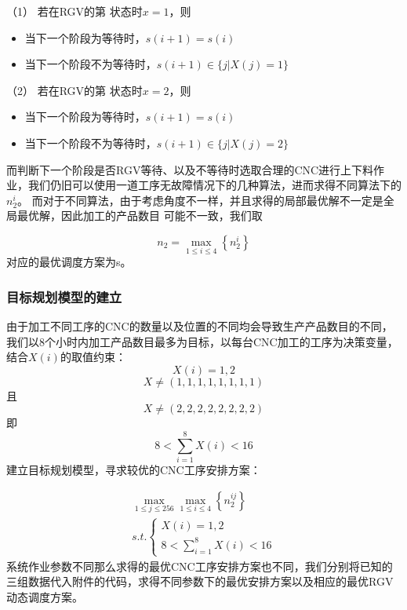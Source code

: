 \documentclass[withoutpreface,bwprint]{cumcmthesis} %
\begin{document}
（1）	若在RGV的第 状态时$ x= 1$，则
\begin{itemize}
\item	当下一个阶段为等待时，$s(i + 1) = s(i)$
\item	当下一个阶段不为等待时，$s(i + 1) \in \{ j|X(j) = 1\} $
\end{itemize}
（2）	若在RGV的第 状态时$ x= 2$，则
\begin{itemize}
\item	当下一个阶段为等待时，$s(i + 1) = s(i)$
\item	当下一个阶段不为等待时，$s(i + 1) \in \{ j|X(j) = 2\} $
\end{itemize}
而判断下一个阶段是否RGV等待、以及不等待时选取合理的CNC进行上下料作业，我们仍旧可以使用一道工序无故障情况下的几种算法，进而求得不同算法下的$n_2^i$。
而对于不同算法，由于考虑角度不一样，并且求得的局部最优解不一定是全局最优解，因此加工的产品数目 可能不一致，我们取
 
\begin{equation}{n_2} = \mathop {\max }\limits_{1 \le i \le 4} \left\{ {n_2^i} \right\}\end{equation}
对应的最优调度方案为s。
\subsubsection{目标规划模型的建立}
由于加工不同工序的CNC的数量以及位置的不同均会导致生产产品数目的不同，我们以8个小时内加工产品数目最多为目标，以每台CNC加工的工序为决策变量，结合$ X(i)$的取值约束：\begin{equation}X(i) = 1,2\end{equation}
\begin{equation}X \ne (1,1,1,1,1,1,1,1)\end{equation}且\begin{equation}X \ne (2,2,2,2,2,2,2,2)\end{equation}即\begin{equation}8 < \sum\limits_{i = 1}^8 {X(i) < 16} \end{equation}
建立目标规划模型，寻求较优的CNC工序安排方案：
 
\begin{equation}\begin{array}{l}
\mathop {\max }\limits_{1 \le j \le 256} \mathop {\max }\limits_{1 \le i \le 4} \left\{ {n_2^{ij}} \right\}\\
s.t.\left\{ \begin{array}{l}
X(i) = 1,2\\
8 < \sum\limits_{i = 1}^8 {X(i) < 16} 
\end{array} \right.
\end{array}\end{equation}
系统作业参数不同那么求得的最优CNC工序安排方案也不同，我们分别将已知的三组数据代入附件的代码，求得不同参数下的最优安排方案以及相应的最优RGV动态调度方案。
\end{document}
